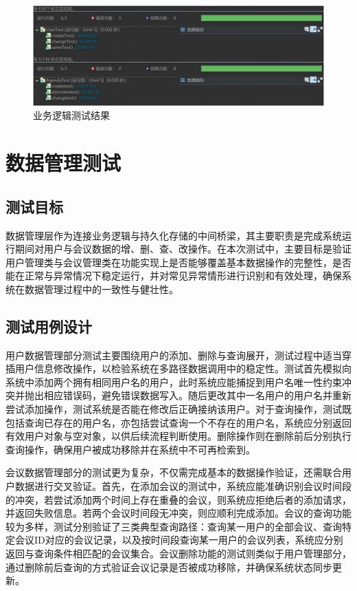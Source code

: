 \documentclass[a4paper, twoside, utf8]{ctexart}
\begin{document}
    \begin{figure}[htbp]
        \centering
        \includegraphics[width=.9\linewidth]{figure/GeneralTest.png}
        \caption{业务逻辑测试结果}
    \end{figure}

    \section{数据管理测试}

    \subsection{测试目标}

    数据管理层作为连接业务逻辑与持久化存储的中间桥梁，其主要职责是完成系统运行期间对用户与会议数据的增、删、查、改操作。在本次测试中，主要目标是验证用户管理类与会议管理类在功能实现上是否能够覆盖基本数据操作的完整性，是否能在正常与异常情况下稳定运行，并对常见异常情形进行识别和有效处理，确保系统在数据管理过程中的一致性与健壮性。

    \subsection{测试用例设计}

    用户数据管理部分测试主要围绕用户的添加、删除与查询展开，测试过程中适当穿插用户信息修改操作，以检验系统在多路径数据调用中的稳定性。测试首先模拟向系统中添加两个拥有相同用户名的用户，此时系统应能捕捉到用户名唯一性约束冲突并抛出相应错误码，避免错误数据写入。随后更改其中一名用户的用户名并重新尝试添加操作，测试系统是否能在修改后正确接纳该用户。对于查询操作，测试既包括查询已存在的用户名，亦包括尝试查询一个不存在的用户名，系统应分别返回有效用户对象与空对象，以供后续流程判断使用。删除操作则在删除前后分别执行查询操作，确保用户被成功移除并在系统中不可再检索到。

    会议数据管理部分的测试更为复杂，不仅需完成基本的数据操作验证，还需联合用户数据进行交叉验证。首先，在添加会议的测试中，系统应能准确识别会议时间段的冲突，若尝试添加两个时间上存在重叠的会议，则系统应拒绝后者的添加请求，并返回失败信息。若两个会议时间段无冲突，则应顺利完成添加。会议的查询功能较为多样，测试分别验证了三类典型查询路径：查询某一用户的全部会议、查询特定会议ID对应的会议记录，以及按时间段查询某一用户的会议列表，系统应分别返回与查询条件相匹配的会议集合。会议删除功能的测试则类似于用户管理部分，通过删除前后查询的方式验证会议记录是否被成功移除，并确保系统状态同步更新。
\end{document}
